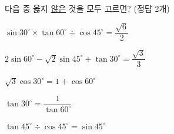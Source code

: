다음 중 옳지 \underline{않은} 것을 모두 고르면? (정답 2개)
\begin{choicesv}{\rule[-3ex]{0pt}{8ex}$\sin 30^\circ\times\tan 60^\circ\div\cos 45^\circ=\dfrac{\sqrt{6}}{2}$}{\rule[-3ex]{0pt}{8ex}$2\sin 60^\circ-\sqrt{2}\sin 45^\circ+\tan 30^\circ=\dfrac{\sqrt{3}}{3}$}{\rule[-3ex]{0pt}{8ex}$\sqrt{3}\cos 30^\circ=1+\cos 60^\circ$}{\rule[-3ex]{0pt}{8ex}$\tan 30^\circ=\dfrac{1}{\tan 60^\circ}$}{\rule[-3ex]{0pt}{8ex}$\tan 45^\circ\div\cos 45^\circ=\sin 45^\circ$}\end{choicesv}
